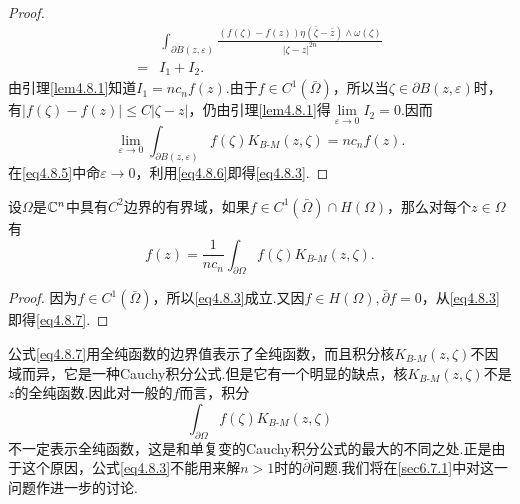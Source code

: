 \begin{proof}
\begin{align*}
	&\int_{\partial B(z,\varepsilon)} \frac{(f(\zeta)-f(z))\eta\left(\bar{\zeta}-\bar{z}\right)\wedge\omega(\zeta)}{|\zeta-z|^{2n}}\\
	=& I_1+I_2.
\end{align*}
由引理\ref{lem4.8.1}知道$I_1=nc_nf(z)$.由于$f\in C^1(\bar{\Omega})$，所以当$\zeta\in\partial B(z,\varepsilon)$时，有$|f(\zeta)-f(z)|\le C|\zeta-z|$，仍由引理\ref{lem4.8.1}得$\lim\limits_{\varepsilon\to0}I_2=0$.因而
\begin{equation}\label{eq4.8.6}
	\lim_{\varepsilon\to0}\int_{\partial B(z,\varepsilon)}f(\zeta) K_{B\text{-}M}(z,\zeta)=nc_n f(z).
\end{equation}
在\eqref{eq4.8.5}中命$\varepsilon\to0$，利用\eqref{eq4.8.6}即得\eqref{eq4.8.3}.
\end{proof}
\begin{corollary}\label{cor4.8.3}
	设$\Omega$是$\mathbb C^n$中具有$C^2$边界的有界域，如果$f\in C^1(\bar{\Omega})\cap H(\Omega)$，那么对每个$z\in\Omega$有
	\begin{equation}\label{eq4.8.7}
		f(z)=\frac1{nc_n}\int_{\partial\Omega}f(\zeta)K_{B\text{-}M}(z,\zeta).
	\end{equation}
\end{corollary}
\begin{proof}
	因为$f\in C^1(\bar{\Omega})$，所以\eqref{eq4.8.3}成立.又因$f\in H(\Omega),\bar{\partial}f=0$，从\eqref{eq4.8.3}即得\eqref{eq4.8.7}.
\end{proof}
公式\eqref{eq4.8.7}用全纯函数的边界值表示了全纯函数，而且积分核$K_{B\text{-}M}(z,\zeta)$不因域而异，它是一种Cauchy积分公式.但是它有一个明显的缺点，核$K_{B\text{-}M}(z,\zeta)$不是$z$的全纯函数.因此对一般的$f$而言，积分
\[\int_{\partial\Omega}f(\zeta)K_{B\text{-}M}(z,\zeta)\]
不一定表示全纯函数，这是和单复变的Cauchy积分公式的最大的不同之处.正是由于这个原因，公式\eqref{eq4.8.3}不能用来解$n>1$时的$\bar{\partial}$问题.我们将在\ref{sec6.7.1}中对这一问题作进一步的讨论.
